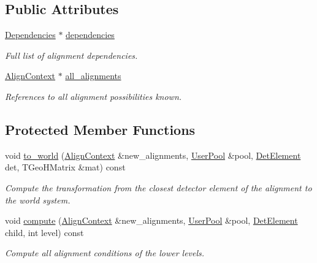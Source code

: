 \subsection*{Public Attributes}
\begin{DoxyCompactItemize}
\item 
\hyperlink{class_d_d4hep_1_1_alignments_1_1_alignments_manager_object_a833ee244e731bbe8cf28bb209181dabc}{Dependencies} $\ast$ \hyperlink{class_d_d4hep_1_1_alignments_1_1_alignments_manager_object_ad936882d8b5fcccecb4a13821539413e}{dependencies}
\begin{DoxyCompactList}\small\item\em Full list of alignment dependencies. \end{DoxyCompactList}\item 
\hyperlink{class_d_d4hep_1_1_alignments_1_1_align_context}{Align\+Context} $\ast$ \hyperlink{class_d_d4hep_1_1_alignments_1_1_alignments_manager_object_ace0f6d572f7c1432436db1aab7a82dca}{all\+\_\+alignments}
\begin{DoxyCompactList}\small\item\em References to all alignment possibilities known. \end{DoxyCompactList}\end{DoxyCompactItemize}
\subsection*{Protected Member Functions}
\begin{DoxyCompactItemize}
\item 
void \hyperlink{class_d_d4hep_1_1_alignments_1_1_alignments_manager_object_a174020db33ce71eebaf24fb0be805fa0}{to\+\_\+world} (\hyperlink{class_d_d4hep_1_1_alignments_1_1_align_context}{Align\+Context} \&new\+\_\+alignments, \hyperlink{class_d_d4hep_1_1_conditions_1_1_user_pool}{User\+Pool} \&pool, \hyperlink{class_d_d4hep_1_1_geometry_1_1_det_element}{Det\+Element} det, T\+Geo\+H\+Matrix \&mat) const
\begin{DoxyCompactList}\small\item\em Compute the transformation from the closest detector element of the alignment to the world system. \end{DoxyCompactList}\item 
void \hyperlink{class_d_d4hep_1_1_alignments_1_1_alignments_manager_object_a91c9cba53d1965f76ab51b1449863225}{compute} (\hyperlink{class_d_d4hep_1_1_alignments_1_1_align_context}{Align\+Context} \&new\+\_\+alignments, \hyperlink{class_d_d4hep_1_1_conditions_1_1_user_pool}{User\+Pool} \&pool, \hyperlink{class_d_d4hep_1_1_geometry_1_1_det_element}{Det\+Element} child, int level) const
\begin{DoxyCompactList}\small\item\em Compute all alignment conditions of the lower levels. \end{DoxyCompactList}\end{DoxyCompactItemize}


